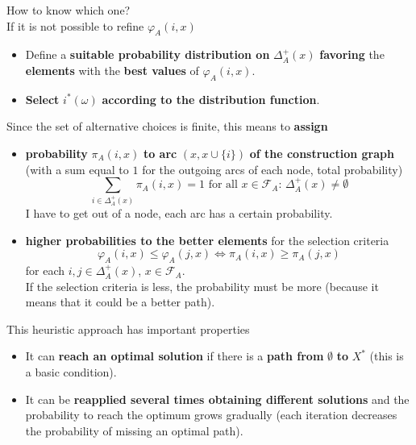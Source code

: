 \documentclass[11pt]{article}
\begin{document}
	How to know which one?\\
	
	If it is not possible to refine $\varphi_A (i, x)$
	\begin{itemize}
		\item Define a \textbf{suitable probability distribution on} $\Delta_A^+ (x)$ \textbf{favoring} the \textbf{elements} with the \textbf{best values} of $\varphi_A (i, x)$.\\
		
		\item \textbf{Select} $i^\ast (\omega)$ \textbf{according to the distribution function}.\\
	\end{itemize}
	
	\newpage
	
	Since the set of alternative choices is finite, this means to \textbf{assign}
	\begin{itemize}
		\item \textbf{probability} $\pi_A (i, x)$ \textbf{to arc} $(x, x \cup \{i\})$ \textbf{of the construction graph} (with a sum equal to $1$ for the outgoing arcs of each node, total probability)
		$$ \sum_{i \in \Delta_A^+ (x)} \pi_A (i,x) = 1 \text{ for all } x \in \mathcal{F}_A : \, \Delta_A^+ (x) \neq \emptyset $$
		I have to get out of a node, each arc has a certain probability.\\
		
		\item \textbf{higher probabilities to the better elements} for the selection criteria
		$$ \varphi_A (i,x) \leq \varphi_A (j,x) \Leftrightarrow \pi_A (i,x) \geq \pi_A (j,x) $$
		for each $i, j \in \Delta_A^+ (x)$, $x \in \mathcal{F}_A$.\\
		If the selection criteria is less, the probability must be more (because it means that it could be a better path).\\
	\end{itemize}
	
	This heuristic approach has important properties
	\begin{itemize}
		\item It can \textbf{reach an optimal solution} if there is a \textbf{path from} $\emptyset$ \textbf{to} $X^\ast$ (this is a basic condition).\\
		
		\item It can be \textbf{reapplied several times obtaining different solutions} and the probability to reach the optimum grows gradually (each iteration decreases the probability of missing an optimal path).\\
	\end{itemize}
	
\end{document}
